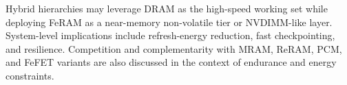 
\noindent
Hybrid hierarchies may leverage DRAM as the high-speed working set while deploying FeRAM as a near-memory non-volatile tier or NVDIMM-like layer. System-level implications include refresh-energy reduction, fast checkpointing, and resilience. Competition and complementarity with MRAM, ReRAM, PCM, and FeFET variants are also discussed in the context of endurance and energy constraints.
